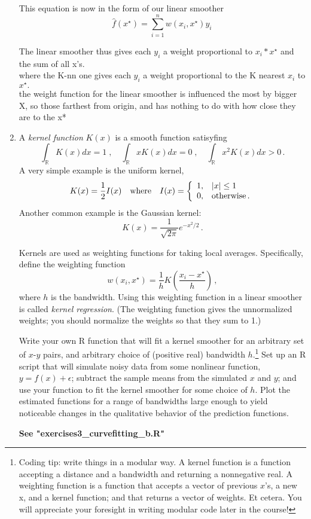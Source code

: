 \documentclass{homework}
\newcommand{\1}{\mathbf{1}}
\begin{document}
\begin{enumerate}[label=(\Alph*)]
\par This equation is now in the form of our linear smoother
$$ \hat{f}(x^{\star}) =  \sum_{i=1}^n w(x_i, x^{\star}) y_i   \, $$

\par The linear smoother thus gives each $y_i$ a weight proportional to $x_i * x^{\star}$ and the sum of all x's.\\
where the K-nn one gives each $y_i$ a weight proportional to the K nearest $x_i$ to $x^{\star}.$
\\ the weight function for the linear smoother is influenced the most by bigger X, so those farthest from origin, and has nothing to do with how close they are to the x*
\\
\item A \textit{kernel function} $K(x)$ is a smooth function satisyfing
$$
\int_\mathbb{R} K(x) dx = 1 \; , \quad \int_\mathbb{R} x K(x) dx = 0 \; , \quad \int_\mathbb{R} x^2 K(x) dx > 0 \, .
$$
A very simple example is the uniform kernel,
$$
K(x) = \frac{1}{2} I(x) \quad \mbox{where} \quad I(x) = 
\left\{
\begin{array}{l l}
1, & |x| \leq 1 \\
0, & \mbox{otherwise} \, . \\
\end{array}
\right.
$$
Another common example is the Gaussian kernel:
$$
K(x) = \frac{1}{\sqrt{2 \pi}} e^{-x^2/2} \, .
$$

Kernels are used as weighting functions for taking local averages.  Specifically, define the weighting function
$$
w(x_i, x^{\star}) = \frac{1}{h} K \left( \frac{x_i - x^{\star}}{h} \right)  \, ,
$$
where $h$ is the bandwidth.    Using this weighting function in a linear smoother is called \textit{kernel regression}.  (The weighting function gives the unnormalized weights; you should normalize the weights so that they sum to 1.)

Write your own R function that will fit a kernel smoother for an arbitrary set of $x$-$y$ pairs, and arbitrary choice of (positive real) bandwidth $h$.\footnote{Coding tip: write things in a modular way.  A kernel function is a function accepting a distance and a bandwidth and returning a nonnegative real.  A weighting function is a function that accepts a vector of previous $x$'s, a new x, and a kernel function; and that returns a vector of weights.  Et cetera.  You will appreciate your foresight in writing modular code later in the course!}  Set up an R script that will simulate noisy data from some nonlinear function, $y = f(x) + \epsilon$; subtract the sample means from the simulated $x$ and $y$; and use your function to fit the kernel smoother for some choice of $h$.  Plot the estimated functions for a range of bandwidths large enough to yield noticeable changes in the qualitative behavior of the prediction functions.

\textbf{See "exercises3\_curvefitting\_b.R"}

\end{enumerate}
\end{document}
